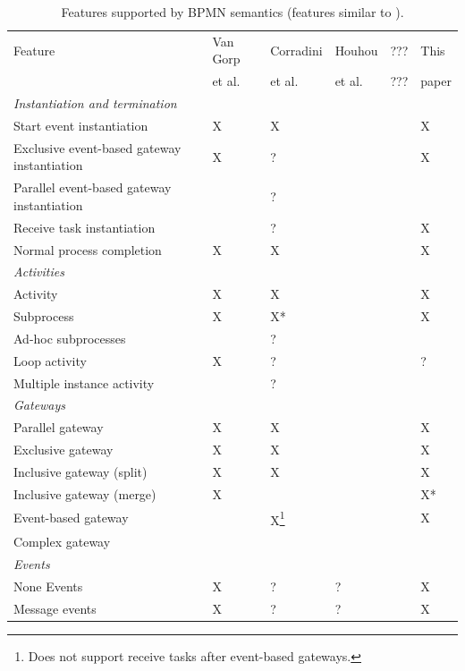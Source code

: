 \documentclass[adraft, copyright, creativecommons]{eptcs} %
\begin{document}
\begin{table}[htbp]
    \caption{Features supported by BPMN semantics (features similar to \cite{vangorpVisualTokenbasedFormalization2013}).}
    \label{tab:supportedFeatures}
    \begin{tabular}{l l l l l l} %
    \hline
      Feature & Van Gorp &  Corradini & Houhou & ??? & This\\
      & et al. \cite{vangorpVisualTokenbasedFormalization2013} & et al. \cite{corradiniFormalApproachAnalysis2021}& et al. \cite{houhouFirstOrderLogicSemantics2019} & ??? & paper\\
      \hline
      \textit{Instantiation and termination} & & &\\
      Start event instantiation & X & X & & & X\\
      Exclusive event-based gateway instantiation & X & ? & & & X\\
      Parallel event-based gateway instantiation &  & ? & & & \\
      Receive task instantiation &  & ? & & & X\\
      Normal process completion & X & X & & & X\\
      \textit{Activities} & & & & &\\
      Activity & X & X & & & X\\
      Subprocess & X & X* & & & X\\
      Ad-hoc subprocesses &  & ? & & &\\
      Loop activity & X & ? & & & ?\\
      Multiple instance activity &  & ? & & & \\
      \textit{Gateways} & & & & &\\
      Parallel gateway & X & X & & & X\\
      Exclusive gateway & X & X & & & X\\
      Inclusive gateway (split) & X & X & & & X\\
      Inclusive gateway (merge) & X & & & & X*\\
      Event-based gateway &  & X\footnote{Does not support receive tasks after event-based gateways.} & & & X\\ %
      Complex gateway & & & & &\\
      \textit{Events} &  &  &  &  & \\
      None Events & X & ? & ? &  & X\\
      Message events & X & ? & ? &  & X\\

\end{tabular}
\end{table}
\end{document}
